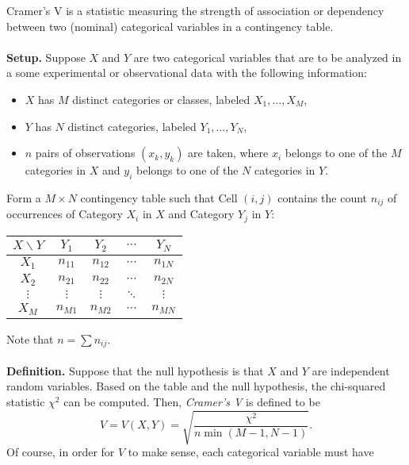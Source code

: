 \documentclass[12pt]{article}
\begin{document}

Cramer's V is a statistic measuring the strength of association or
dependency between two (nominal) categorical variables in a
contingency table.
\\\\
\textbf{Setup.} Suppose $X$ and $Y$ are two categorical variables
that are to be analyzed in a some experimental or observational data
with the following information:
\begin{itemize}
\item $X$ has $M$ distinct categories or classes, labeled
$X_1,\ldots,X_M$,
\item $Y$ has $N$ distinct categories, labeled $Y_1,\ldots,Y_N$,
\item $n$ pairs of observations $(x_k,y_k)$ are taken, where $x_i$
belongs to one of the $M$ categories in $X$ and $y_i$ belongs to one
of the $N$ categories in $Y$.
\end{itemize}
Form a $M\times N$ contingency table such that Cell $(i,j)$ contains
the count $n_{ij}$ of occurrences of Category $X_i$ in $X$ and
Category $Y_j$ in $Y$:
\begin{center}
\begin{tabular}{|c|c|c|c|c|}
\hline
$X\backslash Y$ & $Y_1$ & $Y_2$ & $\cdots$ & $Y_N$ \\
\hline
$X_1$ & $n_{11}$ & $n_{12}$ & $\cdots$ & $n_{1N}$ \\
\hline
$X_2$ & $n_{21}$ & $n_{22}$ & $\cdots$ & $n_{2N}$ \\
\hline
$\vdots$ & $\vdots$ & $\vdots$ & $\ddots$ & $\vdots$ \\
\hline
$X_M$ & $n_{M1}$ & $n_{M2}$ & $\cdots$ & $n_{MN}$ \\
\hline
\end{tabular}
\end{center}
Note that $n=\sum n_{ij}$.
\\\\
\textbf{Definition.} Suppose that the null hypothesis is that $X$
and $Y$ are independent random variables.  Based on the table and
the null hypothesis, the chi-squared statistic $\chi^2$ can be
computed. Then, \emph{Cramer's V} is defined to be
$$V=V(X,Y)=\sqrt{\frac{\chi^2}{n\operatorname{min}(M-1,N-1)}}.$$  Of course,
in order for $V$ to make sense, each categorical variable must have
\end{document}
